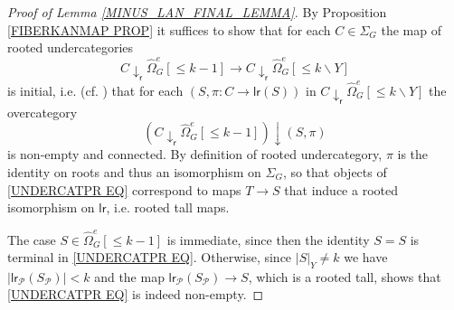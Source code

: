 \documentclass[a4paper,10pt
,draft
]{article}%
\numberwithin{equation}{section}
\numberwithin{figure}{section}
\theoremstyle{definition} %
\newcommand{\1}{\ensuremath{\mathbbm 1}}%
\begin{document}
\begin{proof}[Proof of Lemma \ref{MINUS_LAN_FINAL_LEMMA}]

By Proposition \ref{FIBERKANMAP PROP} it suffices to
show that for each $C \in \Sigma_G$
the map of rooted undercategories
\[
C \downarrow_{\mathsf{r}} \widehat{\Omega}_G^e[\leq\! k-1]
	\to 
C \downarrow_{\mathsf{r}} \widehat{\Omega}_G^e[\leq\! k \mathbin{\backslash} Y]
\]
is initial, i.e. 
(cf. \cite[IX.3]{McL}) that for each
$(S,\pi \colon C \to \mathsf{lr}(S))$ in 
$C \downarrow_{\mathsf{r}} \widehat{\Omega}_G^e[\leq\! k \mathbin{\backslash} Y]$
the overcategory
\begin{equation}\label{UNDERCATPR EQ}
	(C \downarrow_{\mathsf{r}} \widehat{\Omega}_G^e[\leq\! k-1])
		\downarrow
	(S,\pi)  
\end{equation}
is non-empty and connected. 
By definition of rooted undercategory, $\pi$ is the identity on roots and thus an isomorphism on $\Sigma_G$,
so that objects of \eqref{UNDERCATPR EQ}
correspond to maps
$T \to S$
that induce a rooted isomorphism on 
$\mathsf{lr}$, i.e. rooted tall maps.

The case $S\in \widehat{\Omega}_G^e[\leq\! k-1]$ is immediate,
since then the identity $S = S$ is terminal in 
\eqref{UNDERCATPR EQ}.
Otherwise, since $|S|_Y \neq k$ we have
$|\mathsf{lr}_{\mathcal{P}}(S_{\mathcal{P}})|<k$
and the map 
$\mathsf{lr}_{\mathcal{P}}(S_{\mathcal{P}}) \to S$,
which is a rooted tall, shows that
\eqref{UNDERCATPR EQ} is indeed non-empty.


\end{proof}
\end{document}
